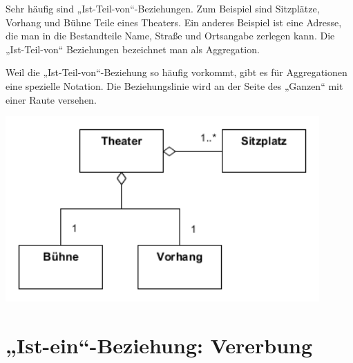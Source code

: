 \begin{minipage}{0.45\textwidth}
Sehr häufig sind „Ist-Teil-von“-Beziehungen.
Zum Beispiel sind Sitzplätze, Vorhang und
Bühne Teile eines Theaters. Ein anderes
Beispiel ist eine Adresse, die man in die
Bestandteile Name, Straße und Ortsangabe
zerlegen kann. Die „Ist-Teil-von“ Beziehungen
bezeichnet man als Aggregation.

Weil die „Ist-Teil-von“-Beziehung so häufig
vorkommt, gibt es für Aggregationen eine
spezielle Notation. Die Beziehungslinie wird an
der Seite des „Ganzen“ mit einer Raute
versehen.
\end{minipage}
\begin{minipage}{0.55\textwidth}
\begin{center}
\includegraphics[width=0.9\textwidth]{./inf/SEKII/15_UML_Klassendiagramme/Aggregation.png}
\end{center}
\end{minipage}


\section{„Ist-ein“-Beziehung: Vererbung}

